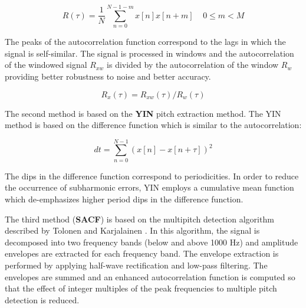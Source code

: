 \documentclass[12pt,oneside]{book}
\begin{document}
\begin{equation} 
R(\tau) = \frac{1}{N} \sum_{n=0}^{N-1-m} x[n] x[n+m] \;\;\;\; 0 \leq m
< M 
\end{equation} 

The peaks of the autocorrelation function correspond to the lags 
in which the signal is self-similar. The signal is processed in
windows and the autocorrelation of the windowed signal $R_{xw}$ is divided 
by the autocorrelation of the window $R_{w}$ providing better robustness to 
noise and better accuracy. 

\begin{equation}
R_{x}(\tau) = R_{xw}(\tau) / R_{w}(\tau)
\end{equation} 

The second method is based on the {\bf YIN} pitch extraction method.
The YIN method is based on the difference function which is similar to
the autocorrelation:

\begin{equation}
d{t} = \sum_{n=0}^{N-1} (x[n] - x[n+\tau])^{2}
\end{equation} 

The dips in the difference function correspond to periodicities. 
In order to reduce the occurrence of subharmonic errors, YIN employs a
cumulative mean function which de-emphasizes higher period dips 
in the difference function. 

The third method ({\bf SACF}) is based on the multipitch detection
algorithm described by Tolonen and Karjalainen \cite{tolonen00}.  In
this algorithm, the signal is decomposed into two frequency bands
(below and above 1000 Hz) and amplitude envelopes are extracted for
each frequency band. The envelope extraction is performed by applying
half-wave rectification and low-pass filtering.  The envelopes are
summed and an enhanced autocorrelation function is computed so that
the effect of integer multiples of the peak frequencies to multiple
pitch detection is reduced.
\end{document}
